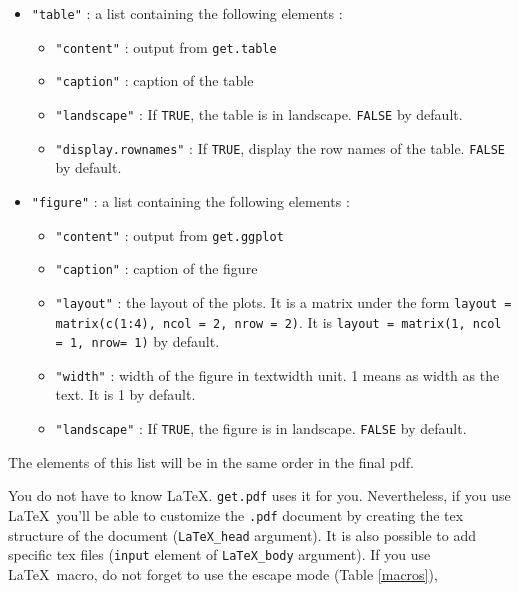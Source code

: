 \documentclass{article}\usepackage[]{graphicx}\usepackage[]{color}
\begin{document}
\begin{itemize}
\item \texttt{"table"} : a list containing the following elements :
	\begin{itemize}
	\item \texttt{"content"} : output from \texttt{get.table}
	\item \texttt{"caption"} : caption of the table
	\item \texttt{"landscape"} : If \texttt{TRUE}, the table is in landscape. \texttt{FALSE} by default.
	\item \texttt{"display.rownames"} : If \texttt{TRUE}, display the row names of the table. \texttt{FALSE} by default.
	\end{itemize}

\item \texttt{"figure"} : a list containing the following elements :
	\begin{itemize}
	\item \texttt{"content"} : output from \texttt{get.ggplot}
	\item \texttt{"caption"} : caption of the figure
	\item \texttt{"layout"} : the layout of the plots. It is a matrix under the form \texttt{layout = matrix(c(1:4), ncol = 2, nrow = 2)}. It is \texttt{layout = matrix(1, ncol = 1, nrow= 1)} by default.
	\item \texttt{"width"} : width of the figure in textwidth unit. 1 means as width as the text. It is 1 by default.
	\item \texttt{"landscape"} : If \texttt{TRUE}, the figure is in landscape. \texttt{FALSE} by default.
	\end{itemize}

\end{itemize}


The elements of this list will be in the same order in the final pdf.

You do not have to know \LaTeX. \texttt{get.pdf} uses it for you.
Nevertheless, if you use \LaTeX~you'll be able to customize the \texttt{.pdf} document by creating the tex structure of the document (\texttt{LaTeX\_head} argument).
It is also possible to add specific tex files (\texttt{input} element of \texttt{LaTeX\_body} argument).
If you use \LaTeX~macro, do not forget to use the escape mode (Table \ref{macros}),
\end{document}
